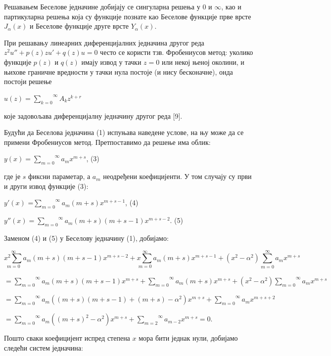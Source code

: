 Решавањем Беселове једначине добијају се сингуларна решења у 0 и
\(\infty\), као и партикуларна решења која су функције познате као
Беселове функције прве врсте \(J_{\alpha}(x)\) и Беселове функције друге
врсте \(Y_{\alpha}(x)\).

При решавању линеарних диференцијалних једначина другог реда
\(z^{2}u'' + p(z)zu' + q(z)u = 0\) често се користи тзв. Фробениусов
метод: уколико функције \(p(z)\) и \(q(z)\) имају извод у тачки
\(z = 0\) или некој њеној околини, и њихове граничне вредности у тачки
нула постоје (и нису бесконачне), онда постоји решење

\(u(z) = \overset{\infty}{\sum_{k = 0}}A_{k}z^{k + r}\)

које задовољава диференцијалну једначину другог реда {[}9{]}.

Будући да Беселова једначина (1) испуњава наведене услове, на њу може да
се примени Фробениусов метод. Претпоставимо да решење има облик:

\(y(x) = \overset{\infty}{\sum_{m = 0}}a_{m}x^{m + s}\), (3)

где је \(s\) фиксни параметар, а \(a_{m}\) неодређени коефицијенти. У
том случају су први и други извод функције (3):

\(y'(x)\)
=\(\overset{\infty}{\sum_{m = 0}}a_{m}\overset{}{(m + s)}x^{m + s - 1}\),
(4)

\(y''(x) = \overset{\infty}{\sum_{m = 0}}a_{m}\overset{}{(m + s)(m + s - 1)}x^{m + s - 2}\).
(5)

Заменом (4) и (5) у Беселову једначину (1), добијамо:

\[\overset{\infty}{\underset{m = 0}{x^{2}\sum}}a_{m}\overset{}{(m + s)(m + s - 1)}x^{m + s - 2} + \overset{\infty}{\underset{m = 0}{x\sum}}a_{m}\overset{}{(m + s)}x^{m + s - 1} + \overset{}{(x^{2} - \alpha^{2})}\overset{\infty}{\sum_{m = 0}}a_{m}x^{m + s}\]

\(= \overset{\infty}{\sum_{m = 0}}a_{m}\overset{}{(m + s)(m + s - 1)}x^{m + s} + \overset{\infty}{\sum_{m = 0}}a_{m}\overset{}{(m + s)}x^{m + s} + \overset{}{(x^{2} - \alpha^{2})}\overset{\infty}{\sum_{m = 0}}a_{m}x^{m + s}\)

\(= \overset{\infty}{\sum_{m = 0}}a_{m}\overset{}{((m + s)(m + s - 1) + (m + s) - \alpha^{2})}x^{m + s} + \overset{\infty}{\sum_{m = 0}}a_{m}x^{m + s + 2}\)

\(= \overset{\infty}{\sum_{m = 0}}a_{m}\overset{}{({(m + s)}^{2} - \alpha^{2})}x^{m + s} + \overset{\infty}{\sum_{m = 2}}a_{m - 2}x^{m + s} = 0\).

Пошто сваки коефицијент испред степена \(x\) мора бити једнак нули,
добијамо следећи систем једначина:

